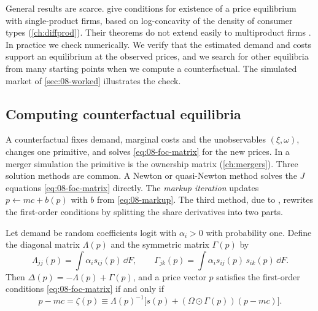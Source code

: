 General results are scarce. \citet{CaplinNalebuff1991} give conditions for existence of a price equilibrium with
single-product firms, based on log-concavity of the density of consumer types (\cref{ch:diffprod}). Their theorems do
not extend easily to multiproduct firms \citep[fn.~12]{BerryLevinsohnPakes1995}. In practice we check numerically.
We verify that the estimated demand and costs support an equilibrium at the observed prices, and we search for other
equilibria from many starting points when we compute a counterfactual. The simulated market of \cref{sec:08-worked}
illustrates the check.

\subsection{Computing counterfactual equilibria}\label{sec:08-supply-ms}

A counterfactual fixes demand, marginal costs and the unobservables $(\xi, \omega)$, changes one primitive, and
solves \eqref{eq:08-foc-matrix} for the new prices. In a merger simulation the primitive is the ownership matrix
(\cref{ch:mergers}). Three solution methods are common. A Newton or quasi-Newton method solves the $J$ equations
\eqref{eq:08-foc-matrix} directly. The \emph{markup iteration} updates $p \leftarrow mc + b(p)$ with $b$ from
\eqref{eq:08-markup}. The third method, due to \citet{MorrowSkerlos2011}, rewrites the first-order conditions by
splitting the share derivatives into two parts.

\begin{proposition}\label{prop:08-ms}
Let demand be random coefficients logit with $\alpha_i > 0$ with probability one. Define the diagonal matrix
$\Lambda(p)$ and the symmetric matrix $\Gamma(p)$ by
\begin{equation}\label{eq:08-ms-lambda}
  \Lambda_{jj}(p) = \int \alpha_i s_{ij}(p)\,\dd F, \qquad
  \Gamma_{jk}(p) = \int \alpha_i s_{ij}(p)\,s_{ik}(p)\,\dd F .
\end{equation}
Then $\Delta(p) = -\Lambda(p) + \Gamma(p)$, and a price vector $p$ satisfies the first-order conditions
\eqref{eq:08-foc-matrix} if and only if
\begin{equation}\label{eq:08-zeta}
  p - mc = \zeta(p) \equiv \Lambda(p)^{-1}\big[s(p) + (\Omega \odot \Gamma(p))(p - mc)\big].
\end{equation}
\end{proposition}

